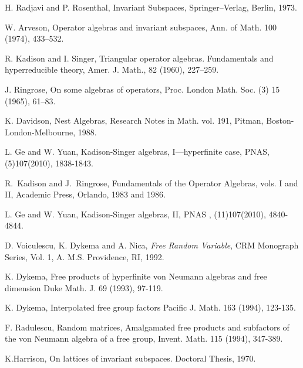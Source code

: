 \documentclass[12pt]{article}
\begin{document}
\begin{thebibliography}{\sl 110}

\baselineskip=16pt \parskip=4pt

 H. Radjavi and P. Rosenthal, {Invariant Subspaces},
Springer--Verlag, Berlin, 1973.

 W. Arveson, {
Operator algebras and invariant subspaces,} Ann. of Math. {100}
(1974), 433--532.

 R. Kadison and I. Singer, { Triangular operator algebras.
Fundamentals and hyperreducible theory}, Amer. J. Math., {82 }
(1960), 227--259.

 J. Ringrose, { On some algebras of operators,} Proc. London
Math. Soc. (3) {15} (1965), 61--83.

  K. Davidson, {Nest Algebras,} Research Notes in Math.
vol. 191, Pitman, Boston-London-Melbourne, 1988.

 L. Ge and W. Yuan, { Kadison-Singer algebras,
I---hyperfinite case,} PNAS, (5)107(2010), 1838-1843.

 R.\ Kadison and J.\ Ringrose, { Fundamentals of the
Operator Algebras}, vols. I and II, Academic Press, Orlando, 1983
and 1986.

 L. Ge and W. Yuan, {Kadison-Singer algebras,
II,} PNAS , (11)107(2010), 4840-4844.

 D. Voiculescu, K. Dykema and A. Nica, \emph{Free
Random Variable}, CRM Monograph Series, Vol. 1, A. M.S. Providence,
RI, 1992.

 K. Dykema, Free products of hyperfinite von Neumann algebras and free dimension
Duke Math. J. 69 (1993), 97-119.

 K. Dykema, Interpolated free group factors
Pacific J. Math. 163 (1994), 123-135.

 F. Radulescu, Random matrices, Amalgamated free products and subfactors of the von
Neumann algebra of a free group, Invent. Math. 115 (1994), 347-389.

K.Harrison, On lattices of invariant subspaces. Doctoral Thesis, 1970.

\end{thebibliography}
\end{document}
